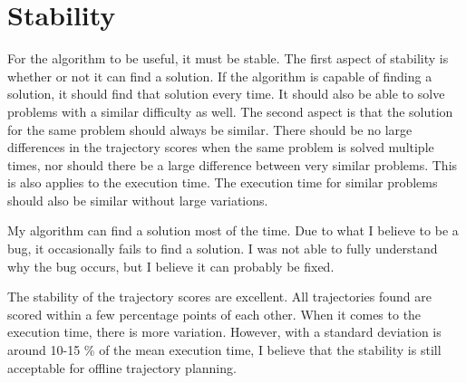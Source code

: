\section{Stability}
For the algorithm to be useful, it must be stable. The first aspect of stability is whether or not it can find a solution. If the algorithm is capable of finding a solution, it should find that solution every time. It should also be able to solve problems with a similar difficulty as well. The second aspect is that the solution for the same problem should always be similar. There should be no large differences in the trajectory scores when the same problem is solved multiple times, nor should there be a large difference between very similar problems. This is also applies to the execution time. The execution time for similar problems should also be similar without large variations.
\par
My algorithm can find a solution most of the time. Due to what I believe to be a bug, it occasionally fails to find a solution. I was not able to fully understand why the bug occurs, but I believe it can probably be fixed.  
\par
The stability of the trajectory scores are excellent. All trajectories found are scored within a few percentage points of each other. When it comes to the execution time, there is more variation. However, with a standard deviation is around 10-15 \% of the mean execution time, I believe that the stability is still acceptable for offline trajectory planning.
%
%
%
